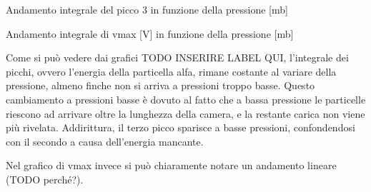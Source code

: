 \begin{grafico}
 \centering
 \caption{Andamento integrale del picco 3 in funzione della pressione [mb]} 
 \label{gr:picchi_int3} 
\end{grafico}

\begin{grafico}
 \centering
 \caption{Andamento integrale di vmax [V] in funzione della pressione [mb]} 
 \label{gr:picchi_vmax} 
\end{grafico}

Come si può vedere dai grafici TODO INSERIRE LABEL QUI, l'integrale dei picchi, ovvero l'energia della particella alfa, rimane costante al variare della pressione,
almeno finche non si arriva a pressioni troppo basse. Questo cambiamento a pressioni basse è dovuto al fatto che a bassa pressione le particelle riescono ad arrivare oltre la lunghezza della camera, e la restante carica non viene più rivelata.
Addirittura, il terzo picco sparisce a basse pressioni, confondendosi con il secondo a causa dell'energia mancante.

Nel grafico di vmax invece si può chiaramente notare un andamento lineare (TODO perché?).

\FloatBarrier